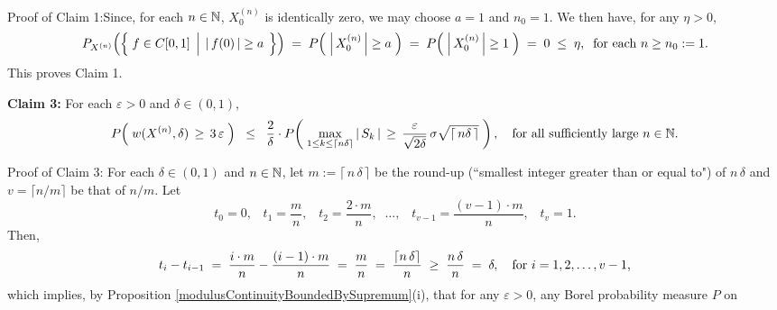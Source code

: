 \vskip 0.5cm
\noindent
Proof of Claim 1:\quad Since, for each $n \in \mathbb{N}$, $X^{(n)}_{0}$ is identically zero, we may
choose $a = 1$ and $n_{0} = 1$. We then have, for any $\eta > 0$,
\begin{equation*}
	P_{X^{(n)}}\!\left(\left\{\;
		f \in \Czo
		\;\left\vert\;\,
		\vert\,f(0)\,\vert \overset{{\color{white}.}}{\geq} a
		\right.
	\;\right\}\right)
	\;=\;
	P\!\left(\; \left\vert\,X^{(n)}_{0}\,\right\vert \overset{{\color{white}.}}{\geq} a \;\right)
	\;=\;
	P\!\left(\; \left\vert\,X^{(n)}_{0}\,\right\vert \overset{{\color{white}.}}{\geq} 1 \;\right)
	\;=\; 0 \;\leq\; \eta,
	\;\;\textnormal{for each $n \geq n_{0} := 1$}.
\end{equation*}
This proves Claim 1.

\vskip 0.5cm
\begin{center}
\begin{minipage}{6.5in}
\noindent
\textbf{Claim 3:}\quad
For each $\varepsilon > 0$ and $\delta \in (0,1)$,
\begin{equation*}
P\!\left(\; w(X^{(n)},\delta) \,\overset{{\color{white}.}}{\geq}\, 3\,\varepsilon \;\right)
\;\; \leq \;\;	\dfrac{2}{\delta}\cdot
	P\!\left(\;
		\underset{1 \leq k\leq\lceil n\delta \rceil}{\max}\,\vert\,S_{k}\,\vert
		\,\overset{{\color{white}.}}{\geq}\,
		\dfrac{\varepsilon}{\sqrt{2\delta}}\,\sigma\sqrt{\lceil\,n\delta\,\rceil} 
	\;\right),
	\quad\textnormal{for all sufficiently large $n \in \N$}.
\end{equation*}
\end{minipage}
\end{center}
Proof of Claim 3:\quad
For each $\delta \in (0,1)$ and $n \in \mathbb{N}$,
let $m := \lceil\,n\,\delta\,\rceil$ be the round-up (``smallest integer greater than or equal to") of $n\,\delta$
and $v = \lceil n/m \rceil$ be that of $n / m$. Let
\begin{equation*}
t_{0} = 0,
\;\;\; t_{1} = \dfrac{m}{n},
\;\;\; t_{2} = \dfrac{2\cdot m}{n},
\;\;\ldots,
\;\;\; t_{v-1} = \dfrac{(v-1)\cdot m}{n},
\;\;\; t_{v} = 1.
\end{equation*}
Then,
\begin{equation*}
t_{i} - t_{i-1}
\;=\; \dfrac{i\cdot m}{n} - \dfrac{(i-1)\cdot m}{n}
\;=\; \dfrac{m}{n}
\;=\; \dfrac{\lceil n\,\delta \rceil}{n}
\;\geq\; \dfrac{n\,\delta}{n}
\;=\; \delta,
\quad
\textnormal{for $i = 1, 2, \ldots, v-1$,}
\end{equation*}
which implies, by Proposition \ref{modulusContinuityBoundedBySupremum}(i),
that for any $\varepsilon > 0$, any Borel probability measure $P$ on
